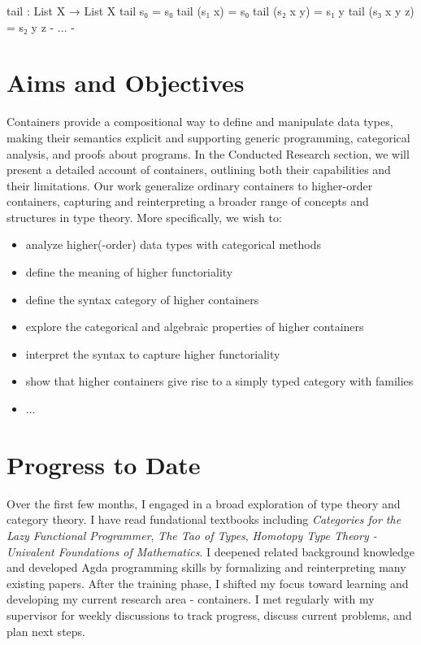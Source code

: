\begin{code}
tail : List X → List X
tail s₀ = s₀
tail (s₁ x) = s₀
tail (s₂ x y) = s₁ y
tail (s₃ x y z) = s₂ y z
{- ... -}
\end{code}

\section{Aims and Objectives}

Containers provide a compositional way to define and manipulate data types, making their semantics explicit and supporting generic programming, categorical analysis, and proofs about programs. In the Conducted Research section, we will present a detailed account of containers, outlining both their capabilities and their limitations. Our work generalize ordinary containers to higher-order containers, capturing and reinterpreting a broader range of concepts and structures in type theory. More specifically, we wish to:

\begin{itemize}
  \item{analyze higher(-order) data types with categorical methods}
  \item{define the meaning of higher functoriality}
  \item{define the syntax category of higher containers}
  \item{explore the categorical and algebraic properties of higher containers}
  \item{interpret the syntax to capture higher functoriality}
  \item{show that higher containers give rise to a simply typed category with families}
  \item{...}
\end{itemize}

\section{Progress to Date}

Over the first few months, I engaged in a broad exploration of type theory and category theory. I have read fundational textbooks including \textit{Categories for the Lazy Functional Programmer}, \textit{The Tao of Types}, \textit{Homotopy Type Theory - Univalent Foundations of Mathematics}. I deepened related background knowledge and developed Agda programming skills by formalizing and reinterpreting many existing papers. After the training phase, I shifted my focus toward learning and developing my current research area - containers. I met regularly with my supervisor for weekly discussions to track progress, discuss current problems, and plan next steps.

